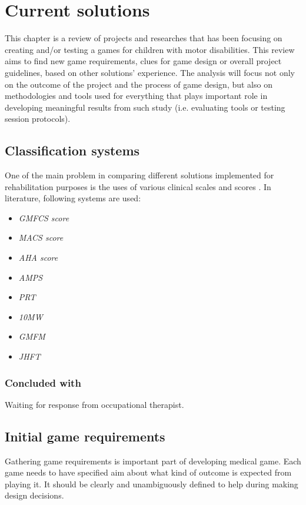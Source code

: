 
\section{Current solutions}
This chapter is a review of projects and researches that has been focusing on creating and/or testing a games for children with motor disabilities. This review aims to find new game requirements, clues for game design or overall project guidelines, based on other solutions' experience. The analysis will focus not only on the outcome of the project and the process of game design, but also on methodologies and tools used for everything that plays important role in developing meaningful results from such study (i.e. evaluating tools or testing session protocols). 

\subsection{Classification systems}
One of the main problem in comparing different solutions implemented for rehabilitation purposes is the uses of various clinical scales and scores \cite{review}. In literature, following systems are used:
\begin{itemize}
\item \emph{GMFCS score}
\item \emph{MACS score}
\item \emph{AHA score}
\item \emph{AMPS}
\item \emph{PRT}
\item \emph{10MW}
\item \emph{GMFM}
\item \emph{JHFT}
\end{itemize}
\subsubsection{Concluded with}
Waiting for response from occupational therapist. 

\subsection{Initial game requirements}
Gathering game requirements is important part of developing medical game. Each game needs to have specified aim about what kind of outcome is expected from playing it. It should be clearly and unambiguously defined to help during making design decisions. 


